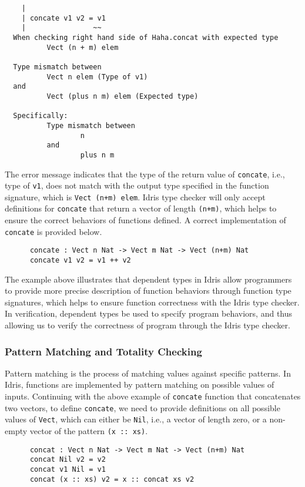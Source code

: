 \begin{lstlisting}
    |
    | concate v1 v2 = v1
    |                ~~
  When checking right hand side of Haha.concat with expected type
          Vect (n + m) elem

  Type mismatch between
          Vect n elem (Type of v1)
  and
          Vect (plus n m) elem (Expected type)

  Specifically:
          Type mismatch between
                  n
          and
                  plus n m
\end{lstlisting}
The error message indicates that the type of the return value of \texttt{concate}, i.e., type of \texttt{v1}, does not match with the output type specified in the function signature, which is \texttt{Vect (n+m) elem}. Idris type checker will only accept definitions for \texttt{concate} that return a vector of length \texttt{(n+m)}, which helps to ensure the correct behaviors of functions defined. A correct implementation of \texttt{concate} is provided below. 
\begin{lstlisting}
      concate : Vect n Nat -> Vect m Nat -> Vect (n+m) Nat
      concate v1 v2 = v1 ++ v2
 \end{lstlisting}
The example above illustrates that dependent types in Idris allow programmers to provide more precise description of function behaviors through function type signatures, which helps to ensure function correctness with the Idris type checker. In verification, dependent types be used to specify program behaviors, and thus allowing us to verify the correctness of program through the Idris type checker. 


\subsubsection*{Pattern Matching and Totality Checking}
Pattern matching is the process of matching values against specific patterns. In Idris, functions are implemented by pattern matching on possible values of inputs. Continuing with the above example of \texttt{concate} function that concatenates two vectors, to define \texttt{concate}, we need to provide definitions on all possible values of \texttt{Vect}, which can either be \texttt{Nil}, i.e., a vector of length zero, or a non-empty vector of the pattern \texttt{(x :: xs)}. 
\begin{lstlisting}
      concat : Vect n Nat -> Vect m Nat -> Vect (n+m) Nat
      concat Nil v2 = v2
      concat v1 Nil = v1
      concat (x :: xs) v2 = x :: concat xs v2
\end{lstlisting}


